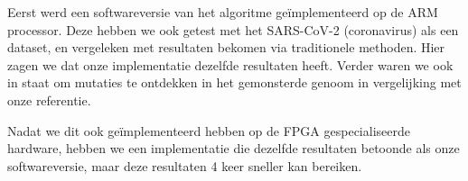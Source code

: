 Eerst werd een softwareversie van het algoritme geïmplementeerd op de ARM processor. Deze hebben we ook getest met het SARS-CoV-2 (coronavirus) als een dataset, en vergeleken met resultaten bekomen via traditionele methoden. Hier zagen we dat onze implementatie dezelfde resultaten heeft. Verder waren we ook in staat om mutaties te ontdekken in het gemonsterde genoom in vergelijking met onze referentie.

Nadat we dit ook geïmplementeerd hebben op de FPGA gespecialiseerde hardware, hebben we een implementatie die dezelfde resultaten betoonde als onze softwareversie, maar deze resultaten 4 keer sneller kan bereiken.